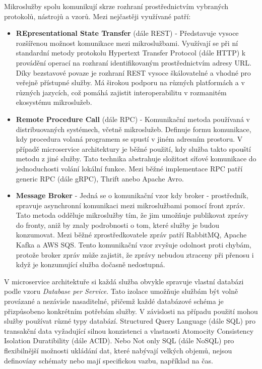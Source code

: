 
Mikroslužby spolu komunikují skrze rozhraní prostřednictvím vybraných protokolů, nástrojů a vzorů. Mezi nejčastěji využívané patří:

\begin{itemize}
    \item \textbf{REpresentational State Transfer} (dále REST) - Představuje vysoce rozšířenou možnost komunikace mezi mikroslužbami. Využívají se při ní standardní metody protokolu Hypertext Transfer Protocol (dále HTTP) k provádění operací na rozhraní identifikovaným prostřednictvím adresy URL. \cite{Newman2015} Díky bezstavové povaze je rozhraní REST vysoce škálovatelné a vhodné pro veřejně přístupné služby. Má širokou podporu na různých platformách a v různých jazycích, což pomáhá zajistit interoperabilitu v rozmanitém ekosystému mikroslužeb.
    \item \textbf{Remote Procedure Call} (dále RPC) - Komunikační metoda používaná v distribuovaných systémech, včetně mikroslužeb. Definuje formu komunikace, kdy procedura volaná programem se spustí v jiném adresním prostoru. V případě microservice architektury je běžné použití, kdy služba takto spouští metodu z jiné služby. \cite{Sazanavets2022} Tato technika abstrahuje složitost síťové komunikace do jednoduchosti volání lokální funkce. Mezi běžné implementace RPC patří generic RPC (dále gRPC), Thrift anebo Apache Avro.
    \item \textbf{Message Broker} - Jedná se o komunikační vzor kdy broker - prostředník, spravuje asynchronní komunikaci mezi mikroslužbami pomocí front zpráv. Tato metoda odděluje mikroslužby tím, že jim umožňuje publikovat zprávy do fronty, aniž by znaly podrobnosti o tom, které služby je budou konzumovat. \cite{Williams2023} Mezi běžné zprostředkovatele zpráv patří RabbitMQ, Apache Kafka a AWS SQS. Tento komunikační vzor zvyšuje odolnost proti chybám, protože broker zpráv může zajistit, že zprávy nebudou ztraceny při přenosu i když je konzumující služba dočasně nedostupná. 
\end{itemize}


V microservice architektuře si každá služba obvykle spravuje vlastní databázi podle vzoru \emph{Database per Service}. Tato izolace umožňuje službám být volně provázané a nezávisle nasaditelné, přičemž každé databázové schéma je přizpůsobeno konkrétním potřebám služby. \cite{Williams2023} V závislosti na případu použití mohou služby používat různé typy databází. Structured Query Language (dále SQL) pro transakční data vyžadující silnou konzistenci a vlastnosti Atomocity Consistency Isolation Duratibility (dále ACID). Nebo Not only SQL (dále NoSQL) pro flexibilnější možnosti ukládání dat, které nabývají velkých objemů, nejsou definovány schématy nebo mají specifickou vazbu, například na čas. 


